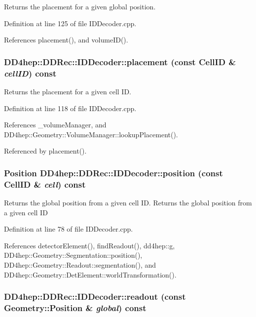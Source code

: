 Returns the placement for a given global position. 

Definition at line 125 of file IDDecoder.cpp.

References placement(), and volumeID().\hypertarget{class_d_d4hep_1_1_d_d_rec_1_1_i_d_decoder_ad17a0d1008a71a45859947c544feab80}{
\subsubsection[{placement}]{ DD4hep::DDRec::IDDecoder::placement (const {\bf CellID} \& {\em cellID}) const}}
\label{class_d_d4hep_1_1_d_d_rec_1_1_i_d_decoder_ad17a0d1008a71a45859947c544feab80}


Returns the placement for a given cell ID. 

Definition at line 118 of file IDDecoder.cpp.

References \_\-volumeManager, and DD4hep::Geometry::VolumeManager::lookupPlacement().

Referenced by placement().\hypertarget{class_d_d4hep_1_1_d_d_rec_1_1_i_d_decoder_a2fa7177db38cced4a6f5173a2fc17b4f}{
\subsubsection[{position}]{\setlength{\rightskip}{0pt plus 5cm}Position DD4hep::DDRec::IDDecoder::position (const {\bf CellID} \& {\em cell}) const}}
\label{class_d_d4hep_1_1_d_d_rec_1_1_i_d_decoder_a2fa7177db38cced4a6f5173a2fc17b4f}


Returns the global position from a given cell ID. Returns the global position from a given cell ID 

Definition at line 78 of file IDDecoder.cpp.

References detectorElement(), findReadout(), dd4hep::g, DD4hep::Geometry::Segmentation::position(), DD4hep::Geometry::Readout::segmentation(), and DD4hep::Geometry::DetElement::worldTransformation().\hypertarget{class_d_d4hep_1_1_d_d_rec_1_1_i_d_decoder_a961907399c9abbd109fc65639293ddfc}{
\subsubsection[{readout}]{ DD4hep::DDRec::IDDecoder::readout (const {\bf Geometry::Position} \& {\em global}) const}}
\label{class_d_d4hep_1_1_d_d_rec_1_1_i_d_decoder_a961907399c9abbd109fc65639293ddfc}


